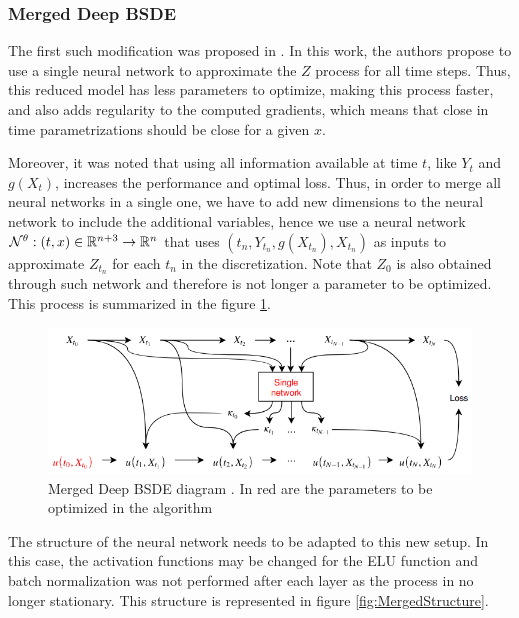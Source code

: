 \subsubsection*{Merged Deep BSDE}
The first such modification was proposed in \cite{chan-wai-nam_machine_2018}. In this work, the authors propose to use a single neural network to approximate the $Z$ process for all time steps. Thus, this reduced model has less parameters to optimize, making this process faster, and also adds regularity to the computed gradients, which means that close in time parametrizations should be close for a given $x$.

Moreover, it was noted that using all information available at time $t$, like $Y_t$ and $g(X_t)$, increases the performance and optimal loss. Thus, in order to merge all neural networks in a single one, we have to add new dimensions to the neural network to include the additional variables, hence we use a neural network $\mathcal{N}^{\theta}:(t,x)\in \mathbb{R}^{n+3}\to\mathbb{R}^n$ that uses $(t_n,Y_{t_n},g(X_{t_n}),X_{t_n})$ as inputs to approximate $Z_{t_{n}}$ for each $t_n$ in the discretization. Note that $Z_0$ is also obtained through such network and therefore is not longer a parameter to be optimized. This process is summarized in the figure \ref{fig:mergeddeepbsdemap}.
\begin{figure}[H]
	\centering
	\includegraphics[width=\linewidth]{images/MergedBSDE}
	\caption{Merged Deep BSDE diagram \cite{chan-wai-nam_machine_2018}. In red are the parameters to be optimized in the algorithm }
	\label{fig:mergeddeepbsdemap}
\end{figure}

The structure of the neural network needs to be adapted to this new setup. In this case, the activation functions may be changed for the ELU function and batch normalization was not performed after each layer as the process in no longer stationary. This structure is represented in figure \ref{fig:MergedStructure}.

